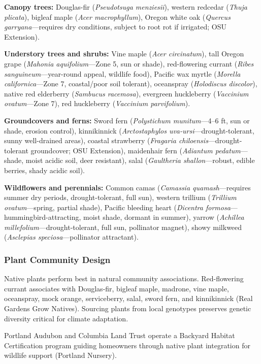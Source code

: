 \documentclass[11pt,letterpaper]{article}
\begin{document}
\textbf{Canopy trees:} Douglas-fir (\textit{Pseudotsuga menziesii}), western redcedar (\textit{Thuja plicata}), bigleaf maple (\textit{Acer macrophyllum}), Oregon white oak (\textit{Quercus garryana}---requires dry conditions, subject to root rot if irrigated; OSU Extension).

\textbf{Understory trees and shrubs:} Vine maple (\textit{Acer circinatum}), tall Oregon grape (\textit{Mahonia aquifolium}---Zone 5, sun or shade), red-flowering currant (\textit{Ribes sanguineum}---year-round appeal, wildlife food), Pacific wax myrtle (\textit{Morella californica}---Zone 7, coastal/poor soil tolerant), oceanspray (\textit{Holodiscus discolor}), native red elderberry (\textit{Sambucus racemosa}), evergreen huckleberry (\textit{Vaccinium ovatum}---Zone 7), red huckleberry (\textit{Vaccinium parvifolium}).

\textbf{Groundcovers and ferns:} Sword fern (\textit{Polystichum munitum}---4--6 ft, sun or shade, erosion control), kinnikinnick (\textit{Arctostaphylos uva-ursi}---drought-tolerant, sunny well-drained areas), coastal strawberry (\textit{Fragaria chiloensis}---drought-tolerant groundcover; OSU Extension), maidenhair fern (\textit{Adiantum pedatum}---shade, moist acidic soil, deer resistant), salal (\textit{Gaultheria shallon}---robust, edible berries, shady acidic soil).

\textbf{Wildflowers and perennials:} Common camas (\textit{Camassia quamash}---requires summer dry periods, drought-tolerant, full sun), western trillium (\textit{Trillium ovatum}---spring, partial shade), Pacific bleeding heart (\textit{Dicentra formosa}---hummingbird-attracting, moist shade, dormant in summer), yarrow (\textit{Achillea millefolium}---drought-tolerant, full sun, pollinator magnet), showy milkweed (\textit{Asclepias speciosa}---pollinator attractant).

\subsubsection{Plant Community Design}

Native plants perform best in natural community associations. Red-flowering currant associates with Douglas-fir, bigleaf maple, madrone, vine maple, oceanspray, mock orange, serviceberry, salal, sword fern, and kinnikinnick (Real Gardens Grow Natives). Sourcing plants from local genotypes preserves genetic diversity critical for climate adaptation.

Portland Audubon and Columbia Land Trust operate a Backyard Habitat Certification program guiding homeowners through native plant integration for wildlife support (Portland Nursery).
\end{document}
